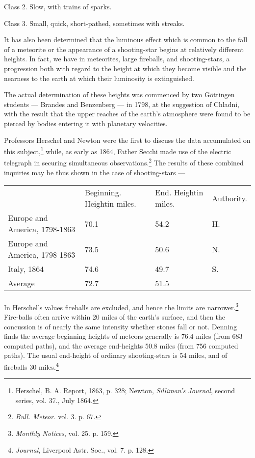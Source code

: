 \documentclass[a4paper, 12pt, oneside, polutonikogreek, english]{article}
\begin{document}
Class 2. Slow, with trains of sparks.

Class 3. Small, quick, short-pathed, sometimes with streaks.

It has also been determined that the luminous effect which is common to the fall of a meteorite or the appearance of a shooting-star begins at relatively different heights. In fact, we have in meteorites, large fireballs, and shooting-stars, a progression both with regard to the height at which they become visible and the nearness to the earth at which their luminosity is extinguished.

The actual determination of these heights was commenced by two Göttingen students --- Brandes and Benzenberg --- in 1798, at the suggestion of Chladni, with the result that the upper reaches of the earth's atmosphere were found to be pierced by bodies entering it with planetary velocities.

Professors Herschel and Newton were the first to discuss the data accumulated on this subject,\footnote{Herschel, B. A. Report, 1863, p. 328; Newton, \emph{Silliman's Journal}, second series, vol. 37., July 1864.} while, as early as 1864, Father Secchi made use of the electric telegraph in securing simultaneous observations.\footnote{\emph{Bull. Meteor.} vol. 3. p. 67.} The results of these combined inquiries may be thus shown in the case of shooting-stars ---
\begin{table}[H]
    \centering
    \begin{tabular}{p{40mm} p{25mm} p{25mm} l}
        ~ & Beginning. Height\newline in miles. & End. Height\newline in miles. & Authority. \\ 
        Europe and America, 1798-1863 & 70.1 & 54.2 & H. \\ 
        Europe and America, 1798-1863 & 73.5 & 50.6 & N. \\ 
        Italy, 1864 & 74.6 & 49.7 & S. \\ \hline
        Average & 72.7 & 51.5 & ~ \\ 
    \end{tabular}
\end{table}
\paragraph{}
In Herschel's values fireballs are excluded, and hence the limits are narrower.\footnote{\emph{Monthly Notices}, vol. 25. p. 159.} Fire-balls often arrive within 20 miles of the earth's surface, and then the concussion is of nearly the same intensity whether stones fall or not. Denning finds the average beginning-heights of meteors generally is 76.4 miles (from 683 computed paths), and the average end-heights 50.8 miles (from 756 computed paths). The usual end-height of ordinary shooting-stars is 54 miles, and of fireballs 30 miles.\footnote{\emph{Journal}, Liverpool Astr. Soc., vol. 7. p. 128.}
\end{document}
